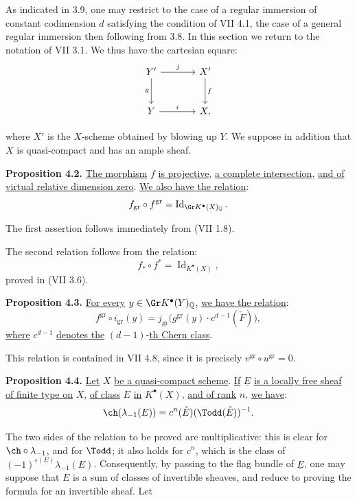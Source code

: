 As indicated in 3.9, one may restrict to the case of a regular immersion of constant codimension \(d\) satisfying the condition of VII 4.1, the case of a general regular immersion then following from 3.8. In this section we return to the notation of VII 3.1. We thus have the cartesian square:
\[
\begin{tikzcd}[column sep=large,row sep=large]
Y' \arrow[r,"j"] \arrow[d,"g"'] & X' \arrow[d,"f"]\\
Y \arrow[r,"i"] & X ,
\end{tikzcd}
\]

%
where \(X'\) is the \(X\)-scheme
obtained by blowing up \(Y\). We suppose in addition that \(X\) is quasi-compact and has an ample sheaf.

\textbf{Proposition 4.2.} \uline{The morphism} \(f\) \uline{is projective}, \uline{a complete intersection}, \uline{and of virtual relative dimension zero}. \uline{We also have the relation}:
\[
 f_{\mathrm{gr}}\circ f^{\mathrm{gr}}=\operatorname{Id}_{\Gr K^{\bullet}(X)_{\mathbb Q}} .
\]

The first assertion follows immediately from (VII 1.8).

The second relation follows from the relation:
\[
 f_*\circ f^*=\operatorname{Id}_{K^{\bullet}(X)},
\]
proved in (VII 3.6).

\textbf{Proposition 4.3.} \uline{For every} \(y\in \Gr K^{\bullet}(Y)_{\mathbb Q}\), \uline{we have the relation}:
\[
 f^{\mathrm{gr}}\circ i_{\mathrm{gr}}(y)
 =
 j_{\mathrm{gr}}\bigl(g^{\mathrm{gr}}(y)\cdot c^{d-1}(\check F)\bigr),
\]
\uline{where} \(c^{d-1}\) \uline{denotes the} \((d-1)\)-\uline{th Chern class}.

This relation is contained in VII 4.8, since it is precisely \(v^{\mathrm{gr}}\circ u^{\mathrm{gr}}=0\).

\textbf{Proposition 4.4.} \uline{Let} \(X\) \uline{be a quasi-compact scheme}. \uline{If} \(\underline{E}\) \uline{is a locally free sheaf of finite type on} \(X\), \uline{of class} \(E\) \uline{in} \(K^{\bullet}(X)\), \uline{and of rank} \(n\), \uline{we have}:
\[
 \ch(\lambda_{-1}(E))=c^n(\check E)(\Todd(\check E))^{-1}.
\]

The two sides of the relation to be proved are multiplicative: this is clear for \(\ch\circ\lambda_{-1}\), and for \(\Todd\); it also holds for \(c^n\), which is the class of \((-1)^{\varepsilon(E)}\lambda_{-1}(E)\). Consequently, by passing to the flag bundle of \(\underline{E}\), one may suppose that \(E\) is a sum of classes of invertible sheaves, and reduce to proving the formula for an invertible sheaf. Let

